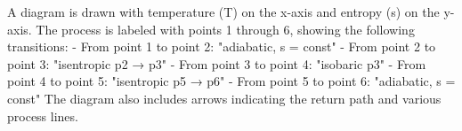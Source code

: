 A diagram is drawn with temperature (T) on the x-axis and entropy (s) on the y-axis. The process is labeled with points 1 through 6, showing the following transitions:  
- From point 1 to point 2: "adiabatic, s = const"  
- From point 2 to point 3: "isentropic p2 → p3"  
- From point 3 to point 4: "isobaric p3"  
- From point 4 to point 5: "isentropic p5 → p6"  
- From point 5 to point 6: "adiabatic, s = const"  
The diagram also includes arrows indicating the return path and various process lines.